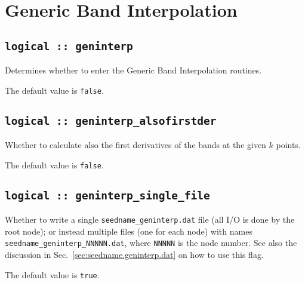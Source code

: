 \section{Generic Band Interpolation}
\subsection[boltzwann]{\tt logical :: geninterp}
Determines whether to enter the Generic Band Interpolation routines.

The default value is \verb#false#.

\subsection[geninterp\_alsofirstder]{\tt logical :: geninterp\_alsofirstder}
Whether to calculate also the first derivatives of the bands at the
given $k$ points.

The default value is \verb#false#.

\subsection[geninterp\_alsofirstder]{\tt logical :: geninterp\_single\_file}
Whether to write a single  {\tt seedname\_geninterp.dat} file (all I/O is done by the root node); or
instead multiple files (one for each node) with
names {\tt seedname\_geninterp\_NNNNN.dat}, where {\tt NNNNN} is the
node number.
See also the discussion in Sec.~\ref{sec:seedname.geninterp.dat} on
how to use this flag.

The default value is \verb#true#.

